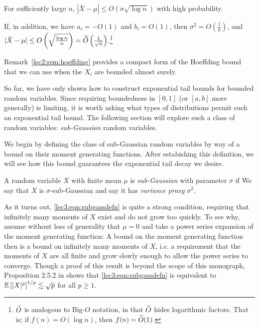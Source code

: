 \begin{remark}
    For sufficiently large $n$, $|\bar{X} - \mu | \leq O(\sigma \sqrt{\log{n}})$ with high probability.
\end{remark}

\begin{remark}\label{lec2:rem:hoeffding}
    If, in addition, we have $a_i = -O(1)$ and $b_i = O(1)$, then $\sigma^2 = O \left( \frac{1}{n}\right)$, and $|\bar{X} - \mu | \leq O\left(\sqrt{\frac{\log n}{n}}\right) = \widetilde{O}\left(\frac{1}{\sqrt{n}}\right)$.\footnote{$\widetilde{O}$ is analogous to Big-$O$ notation, in that $\widetilde{O}$ hides logarithmic factors. That is; if $f(n) = O(\log n)$, then $f(n) = \widetilde{O}(1)$.}
\end{remark}

Remark~\ref{lec2:rem:hoeffding} provides a compact form of the Hoeffding bound that we can use when the $X_i$ are bounded almost surely. 

So far, we have only shown how to construct exponential tail bounds for bounded random variables. Since requiring boundedness in $[0, 1]$ (or $[a, b]$ more generally) is limiting, it is worth asking what types of distributions permit such an exponential tail bound. The following section will explore such a class of random variables: \emph{sub-Gaussian} random variables.


We begin by defining the class of sub-Gaussian random variables by way of a bound on their moment generating functions. After estabishing this definition, we will see how this bound guarantees the exponential tail decay we desire.

\begin{definition}
    A random variable $X$ with finite mean $\mu$ is \textit{sub-Gaussian} with parameter $\sigma$ if
    We say that $X$ is $\sigma$-sub-Gaussian and say it has \emph{variance proxy} $\sigma^2$.
\end{definition}

\begin{remark}\label{lec3:rem:mgf_strong}
    As it turns out, \eqref{lec3:eqn:subgassdefn} is quite a strong condition, requiring that infinitely many moments of $X$ exist and do not grow too quickly. To see why, assume without loss of generality that $\mu = 0$ and take a power series expansion of the moment generating function:
    A bound on the moment generating function then is a bound on infinitely many moments of $X$, i.e. a requirement that the moments of $X$ are all finite and grow slowly enough to allow the power series to converge. Though a proof of this result is beyond the scope of this monograph, Proposition 2.5.2 in \cite{vershynin2018high} shows that \eqref{lec3:eqn:subgassdefn} is equivalent to $\operatorname*{\mathbb{E}} \left [|X|^p \right ]^{1/p} \lesssim \sqrt{p}$ for all $p \geq 1$.
\end{remark}

